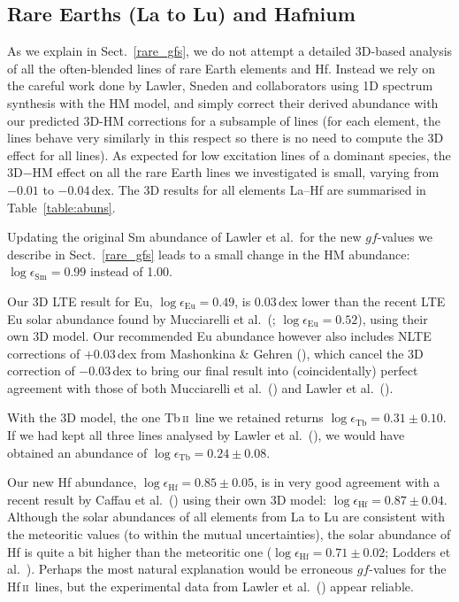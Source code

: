 \documentclass[traditabstract]{aa}
\newcommand{\alttbii}{Tb\,\textsc{ii}}
\newcommand{\althfii}{Hf\,\textsc{ii}}
\newcommand{\tbii}{\alttbii\ }
\newcommand{\hfii}{\althfii\ }
\begin{document}
\subsection{Rare Earths (La to Lu) and Hafnium}
As we explain in Sect.\ \ref{rare_gfs}, we do not attempt a detailed 3D-based analysis of all the often-blended lines of rare Earth elements and Hf. Instead we rely on the careful work done by Lawler, Sneden and collaborators using 1D spectrum synthesis with the HM model, and simply correct their derived abundance with our predicted 3D-HM corrections for a subsample of lines (for each element, the lines behave very similarly in this respect so there is no need to compute the 3D effect for all lines).
As expected for low excitation lines of a dominant species, the 3D$-$HM effect on all the rare Earth lines we investigated is small, varying from $-0.01$ to $-0.04$\,dex. The 3D results for all elements La--Hf are summarised in Table~\ref{table:abuns}.

Updating the original Sm abundance of Lawler et al.\ for the new $gf$-values we describe in Sect.\ \ref{rare_gfs} leads to a small change in the HM abundance: $\log\epsilon_{\mathrm{Sm}}=0.99$ instead of 1.00.  

Our 3D LTE result for Eu, $\log\epsilon_{\mathrm{Eu}}=0.49$, is 0.03\,dex lower than the recent LTE Eu solar abundance found by Mucciarelli et al.\ (\cite{mucc}; $\log\epsilon_{\mathrm{Eu}}=0.52$), using their own 3D model. Our recommended Eu abundance however also includes NLTE corrections of $+0.03$\,dex from Mashonkina \& Gehren (\cite{mash2}), which cancel the 3D correction of $-0.03$\,dex to bring our final result into (coincidentally) perfect agreement with those of both Mucciarelli et al.\ (\cite{mucc}) and Lawler et al.\ (\cite{law4}).

With the 3D model, the one \tbii line we retained returns $\log\epsilon_{\mathrm{Tb}}=0.31\pm0.10$. If we had kept all three lines analysed by Lawler et al.\ (\cite{law5}), we would have obtained an abundance of $\log\epsilon_{\mathrm{Tb}}=0.24\pm0.08$.

Our new Hf abundance, $\log\epsilon_{\mathrm{Hf}}=0.85\pm0.05$, is in very good agreement with a recent result by Caffau et al.\ (\cite{caf2}) using their own 3D model: $\log\epsilon_{\mathrm{Hf}}=0.87\pm0.04$.  Although the solar abundances of all elements from La to Lu are consistent with the meteoritic values (to within the mutual uncertainties), the solar abundance of Hf is quite a bit higher than the meteoritic one ($\log \epsilon_{\mathrm{Hf}}=0.71\pm0.02$; Lodders et al.\ \cite{lodd}). Perhaps the most natural explanation would be erroneous $gf$-values for the \hfii lines, but the experimental data from Lawler et al.\ (\cite{law8}) appear reliable. 
\end{document}
